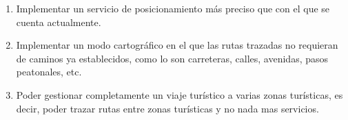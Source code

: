 \begin{enumerate}
	\item Implementar un servicio de posicionamiento más preciso que con el que se cuenta actualmente.
	
	\item Implementar un modo cartográfico en el que las rutas trazadas no requieran de caminos ya establecidos, como lo son carreteras, calles, avenidas, pasos peatonales, etc.
	
	\item Poder gestionar completamente un viaje turístico a varias zonas turísticas, es decir, poder trazar rutas entre zonas turísticas y no nada mas servicios.
	
\end{enumerate}